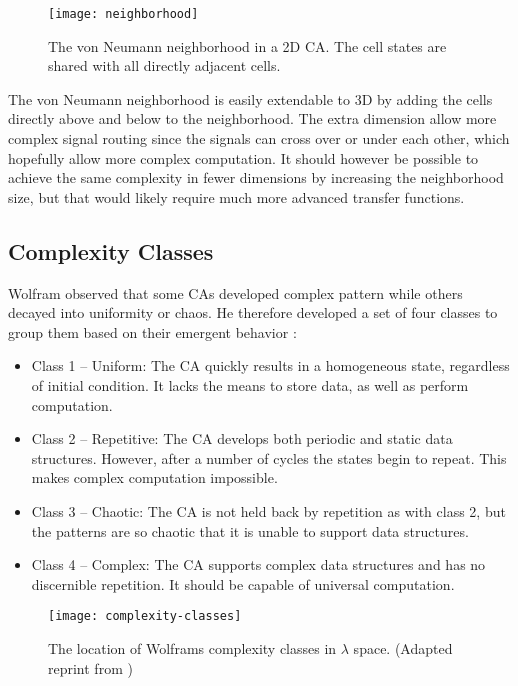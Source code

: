 \begin{figure}[!ht]
    \centering
    \texttt{[image: neighborhood]}
    \caption[von Neumann Neighborhood]{
        The von Neumann neighborhood in a 2D CA.
        The cell states are shared with all directly adjacent cells.
    }
    \label{fig:neighborhood}
\end{figure}

The von Neumann neighborhood is easily extendable to 3D by adding the cells directly above and below to the neighborhood.
The extra dimension allow more complex signal routing since the signals can cross over or under each other, which hopefully allow more complex computation.
It should however be possible to achieve the same complexity in fewer dimensions by increasing the neighborhood size, but that would likely require much more advanced transfer functions.

\subsection{Complexity Classes}

Wolfram observed that some CAs developed complex pattern while others decayed into uniformity or chaos.
He therefore developed a set of four classes to group them based on their emergent behavior \cite{wolfram1984complexity}:

\begin{itemize}
    \item Class 1 – Uniform:
        The CA quickly results in a homogeneous state, regardless of initial condition.
        It lacks the means to store data, as well as perform computation.
    \item Class 2 – Repetitive:
        The CA develops both periodic and static data structures.
        However, after a number of cycles the states begin to repeat.
        This makes complex computation impossible.
    \item Class 3 – Chaotic:
        The CA is not held back by repetition as with class 2, but the patterns are so chaotic that it is unable to support data structures.
    \item Class 4 – Complex:
        The CA supports complex data structures and has no discernible repetition.
        It should be capable of universal computation.
\end{itemize}

\begin{figure}[!ht]
    \centering
    \texttt{[image: complexity-classes]}
    \caption[Complexity classes]{
        The location of Wolframs complexity classes in $\lambda$ space.
        (Adapted reprint from \cite{langton1990edgeofchaos})
    }
    \label{fig:complexity-classes}
\end{figure}

